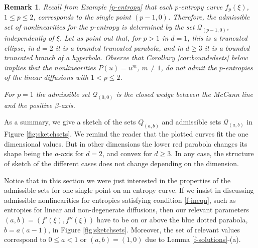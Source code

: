 \documentclass[reqno]{amsart}
\newtheorem{remark}[lemma]{Remark}
\begin{document}
\begin{remark}\label{rm:pentroparam}
Recall from Example \ref{p-entropy} that each $p$-entropy curve $f_p(\xi)$, $1\le p\le 2$, corresponds to the single point $(p-1,0)$. Therefore, the admissible set of nonlinearities for the $p$-entropy is determined by the set $\mathcal{Q}_{(p-1,0)}$, independently of $\xi$. Let us point out that, for $p>1$ in $d=1$, this is a truncated ellipse, in $d=2$ it is a bounded truncated parabola, and in $d\ge3$ it is a bounded truncated branch of a hyperbola. Observe that Corollary \ref{cor:boundedsets} below implies that the nonlinearities
$P(u)=u^m$, $m\neq 1$, do not admit the $p$-entropies of the linear diffusions with $1< p\le 2$.

For $p=1$ the admissible set $\mathcal{Q}_{(0,0)}$ is the closed wedge between the McCann line and the positive $\beta$-axis.
\end{remark}

As a summary, we give a sketch of the sets $Q_{(a,b)}$ and admissible sets $\mathcal{Q}_{(a,b)}$ in Figure \ref{fig:sketchsets}. We remind the reader that the plotted curves fit the one dimensional values. But in other dimensions the lower red parabola changes its shape being the $a$-axis for $d=2$, and convex for $d\geq 3$. In any case, the structure of sketch of the different cases does not change depending on the dimension.

Notice that in this section we were just interested in the properties of the admissible sets for one single point on an entropy curve. If we insist in discussing admissible nonlinearities for entropies satisfying condition \eqref{f-inequ}, such as entropies for linear and non-degenerate diffusions, then our relevant parameters $(a,b)=(f'(\xi),f''(\xi))$ have to be on or above the blue dotted parabola, $b=a(a-1)$, in Figure \ref{fig:sketchsets}. Moreover, the set of relevant values correspond to $0\leq a<1$ or $(a,b)=(1,0)$ due to Lemma \ref{f-solutions}-(a).
\end{document}
